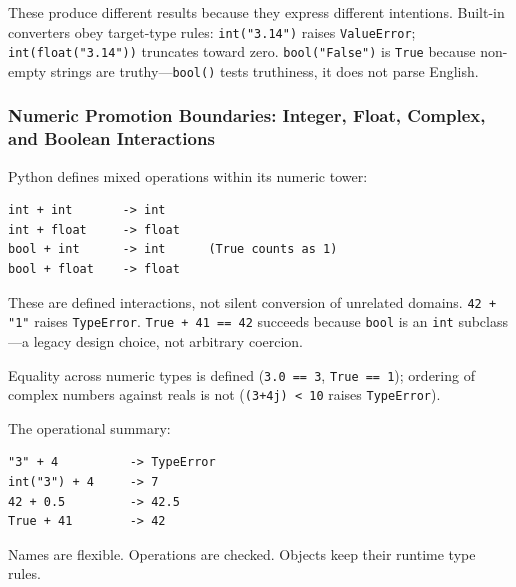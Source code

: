 These produce different results because they express different intentions. Built-in converters obey target-type rules: \texttt{int("3.14")} raises \texttt{ValueError}; \texttt{int(float("3.14"))} truncates toward zero. \texttt{bool("False")} is \texttt{True} because non-empty strings are truthy---\texttt{bool()} tests truthiness, it does not parse English.

\subsubsection{Numeric Promotion Boundaries: Integer, Float, Complex, and Boolean Interactions}

Python defines mixed operations within its numeric tower:

\begin{verbatim}
int + int       -> int
int + float     -> float
bool + int      -> int      (True counts as 1)
bool + float    -> float
\end{verbatim}

These are defined interactions, not silent conversion of unrelated domains. \texttt{42 + "1"} raises \texttt{TypeError}. \texttt{True + 41 == 42} succeeds because \texttt{bool} is an \texttt{int} subclass---a legacy design choice, not arbitrary coercion.

Equality across numeric types is defined (\texttt{3.0 == 3}, \texttt{True == 1}); ordering of complex numbers against reals is not (\texttt{(3+4j) < 10} raises \texttt{TypeError}).

The operational summary:

\begin{verbatim}
"3" + 4          -> TypeError
int("3") + 4     -> 7
42 + 0.5         -> 42.5
True + 41        -> 42
\end{verbatim}

Names are flexible. Operations are checked. Objects keep their runtime type rules.
